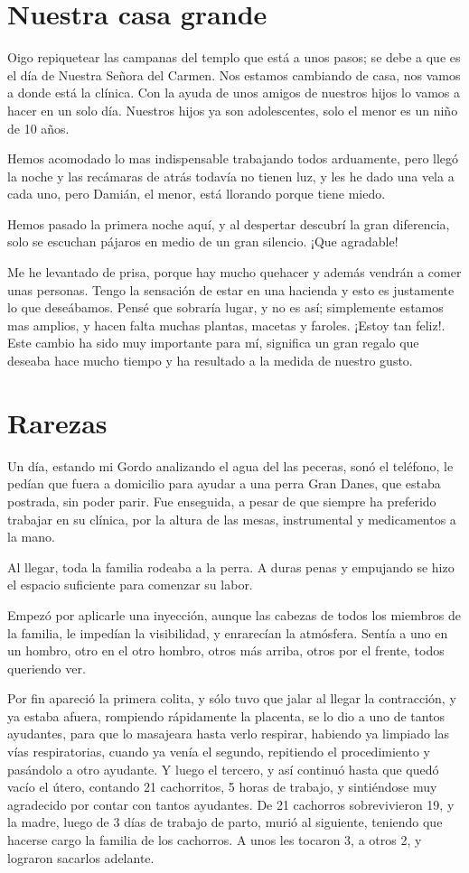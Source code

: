 \documentclass[letterpaper, 12pt]{book}
\begin{document}
\chapter{Nuestra casa grande}
Oigo repiquetear las campanas del templo que está a unos pasos; se debe a que es el día de Nuestra Señora del Carmen. Nos estamos cambiando de casa, nos vamos a donde está la clínica. Con la ayuda de unos amigos de nuestros hijos lo vamos a hacer en un solo día. Nuestros hijos ya son adolescentes, solo el menor es un niño de 10 años. 

Hemos acomodado lo mas indispensable trabajando todos arduamente, pero llegó la noche y las recámaras de atrás todavía no tienen luz, y les he dado una vela a cada uno, pero Damián, el menor, está llorando porque tiene miedo.

Hemos pasado la primera noche aquí, y al despertar descubrí la gran diferencia, solo se escuchan pájaros en medio de un gran silencio. ¡Que agradable!

Me he levantado de prisa, porque hay mucho quehacer y además vendrán a comer unas personas. Tengo la sensación de estar en una hacienda y esto es justamente lo que deseábamos. Pensé que sobraría lugar, y no es así; simplemente estamos mas amplios, y hacen falta muchas plantas, macetas y faroles. ¡Estoy tan feliz!. Este cambio ha sido muy importante para mí, significa un gran regalo que deseaba hace mucho tiempo y ha resultado a la medida de nuestro gusto.

\chapter{Rarezas}
Un día, estando mi Gordo analizando el agua del las peceras, sonó el teléfono, le pedían que fuera a domicilio para ayudar a una perra Gran Danes, que estaba postrada, sin poder parir. Fue enseguida, a pesar de que siempre ha preferido trabajar en su clínica, por la altura de las mesas, instrumental y medicamentos a la mano.

Al llegar, toda la familia rodeaba a la perra. A duras penas y empujando se hizo el espacio suficiente para comenzar su labor.

Empezó por aplicarle una inyección, aunque las cabezas de todos los miembros de la familia, le impedían la visibilidad, y enrarecían la atmósfera. Sentía a uno en un hombro, otro en el otro hombro, otros más arriba, otros por el frente, todos queriendo ver.

Por fin apareció la primera colita, y sólo tuvo que jalar al llegar la contracción, y ya estaba afuera, rompiendo rápidamente la placenta, se lo dio a uno de tantos ayudantes, para que lo masajeara hasta verlo respirar, habiendo ya limpiado las vías respiratorias, cuando ya venía el segundo, repitiendo el procedimiento y pasándolo a otro ayudante. Y luego el tercero, y así continuó hasta que quedó vacío el útero, contando 21 cachorritos, 5 horas de trabajo, y sintiéndose muy agradecido por contar con tantos ayudantes. De 21 cachorros sobrevivieron 19, y la madre, luego de 3 días de trabajo de parto, murió al siguiente, teniendo que hacerse cargo la familia de los cachorros. A unos les tocaron 3, a otros 2, y lograron sacarlos adelante.
\end{document}
